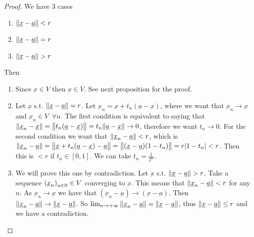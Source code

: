 \documentclass[10pt]{extarticle}
\renewcommand{\vec}[1]{\underbar{\ensuremath{#1}}}
\begin{document}
                \begin{proof}
                    We have 3 cases

                    \begin{enumerate}
                        \item $\norm{\vec{x} - \vec{a}} < r$
                        \item $\norm{\vec{x} - \vec{a}} = r$
                        \item $\norm{\vec{x} - \vec{a}} > r$
                    \end{enumerate}

                    Then

                    \begin{enumerate}
                        \item Since $\vec{x} \in V$ then $\vec{x} \in \overline{V}$. See next proposition for the proof.
                        \item Let $\vec{x}$ s.t. $\norm{\vec{x} - \vec{a}} = r$.
                              Let $\vec{x}_n = \vec{x} + t_n(\vec{a} - \vec{x})$, where we want that $\vec{x}_n \to \vec{x}$ and $\vec{x}_n \in V \enspace \forall n$.
                              The first condition is equivalent to saying that $\norm{\vec{x}_n - \vec{x}} = \norm{t_n(\vec{a} - \vec{x})} = t_n \norm{\vec{a} - \vec{x}} \to 0$, therefore we want $t_n \to 0$.
                              For the second condition we want that $\norm{\vec{x}_n - \vec{a}} < r$, which is
                              $\norm{\vec{x}_n - \vec{a}} = \norm{\vec{x} + t_n(\vec{a} - \vec{x}) - \vec{a}} = \norm{(\vec{x} - \vec{a})(1 - t_n)} = r \abs{1 - t_n} < r$. Then this is $< r$ if $t_n \in [0, 1]$.
                              We can take $t_n = \frac{1}{2^n}$.
                        \item We will prove this one by contradiction. Let $\vec{x}$ s.t. $\norm{\vec{x} - \vec{a}} > r$.
                              Take a sequence $\left(\vec{x}_n\right)_{n \in \N} \in V$ converging to $\vec{x}$.
                              This means that $\norm{\vec{x}_n - \vec{a}} < r$ for any $n$.
                              As $\vec{x}_n \to \vec{x}$ we have that $(\vec{x}_n - \vec{a}) \to (\vec{x} - \vec{a})$.
                              Then $\norm{\vec{x}_n - \vec{a}} \to \norm{\vec{x} - \vec{a}}$.
                              So $\lim_{n \to +\infty} \norm{\vec{x}_n - \vec{a}} = \norm{\vec{x} - \vec{a}}$, thus $\norm{\vec{x} - \vec{a}} \leq r$ and we have a contradiction.
                    \end{enumerate}
                \end{proof}
\end{document}
